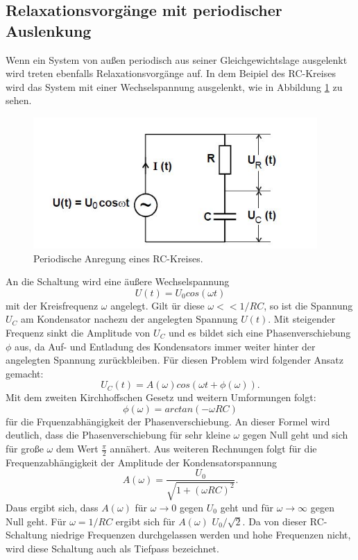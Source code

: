 \subsection{Relaxationsvorgänge mit periodischer Auslenkung}
Wenn ein System von außen periodisch aus seiner Gleichgewichtslage ausgelenkt wird
treten ebenfalls Relaxationsvorgänge auf. In dem Beipiel des RC-Kreises wird
das System mit einer Wechselspannung ausgelenkt, wie in Abbildung \ref{fig:RCsin}
zu sehen.
\begin{figure}[H]
  \centering
  \includegraphics[height=5cm]{RCsin.JPG}
  \caption{Periodische Anregung eines RC-Kreises.}
  \label{fig:RCsin}
\end{figure}
An die Schaltung wird eine äußere Wechselspannung
\begin{equation}
  U(t)=U_{0}cos(\omega t)
\end{equation}
mit der Kreisfrequenz $\omega$ angelegt. Gilt ür diese $\omega<<1/RC$, so ist
die Spannung $U_{C}$ am Kondensator nachezu der angelegten Spannung $U(t)$.
Mit steigender Frequenz sinkt die Amplitude von $U_{C}$ und es bildet sich eine
Phasenverschiebung $\phi$ aus, da Auf- und Entladung des Kondensators immer weiter
hinter der angelegten Spannung zurückbleiben.
Für diesen Problem wird folgender Ansatz gemacht:
\begin{equation}
  U_{C}(t)=A(\omega)cos(\omega t + \phi(\omega)).
\end{equation}
Mit dem zweiten Kirchhoffschen Gesetz und weitern Umformungen folgt:
\begin{equation}
  \phi(\omega)= arctan(-\omega RC)
\end{equation}
für die Frquenzabhängigkeit der Phasenverschiebung.
An dieser Formel wird deutlich, dass die Phasenverschiebung für sehr kleine
$\omega$ gegen Null geht und sich für große $\omega$ dem Wert $\frac{\pi}{2}$
annähert.
Aus weiteren Rechnungen folgt für die Frequenzabhängigkeit der Amplitude der
Kondensatorspannung
\begin{equation}
  A(\omega)=\frac{U_{0}}{\sqrt{1+(\omega RC)^2}}.
  \label{eqn:amplitude}
\end{equation}
Daus ergibt sich, dass $A(\omega)$ für $\omega \to 0$ gegen $U_{0}$ geht und
für $\omega \to \infty$ gegen Null geht. Für $\omega = 1/RC$ ergibt sich für $A(\omega)$
$U_{0}/\sqrt{2}$.
Da von dieser RC-Schaltung niedrige Frequenzen durchgelassen werden und
hohe Frequenzen nicht, wird diese Schaltung auch als Tiefpass bezeichnet.
